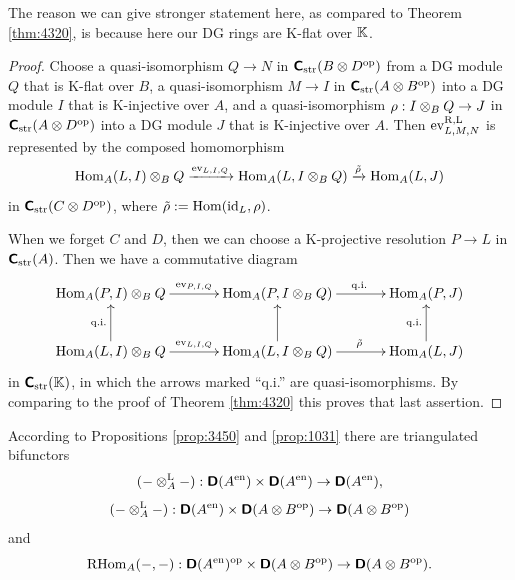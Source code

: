 The reason we can give stronger statement here, as compared to 
Theorem \ref{thm:4320}, is because here our DG rings are K-flat 
over $\mathbb{K}$. 

\begin{proof}
Choose a quasi-isomorphism $Q \to N$ in 
$\boldsymbol{\mathsf{C}}_{\mathrm{str}}(B \otimes D^{\mathrm{op}})$ from a DG module $Q$ that is 
K-flat over $B$, a quasi-isomorphism $M \to I$ in 
$\boldsymbol{\mathsf{C}}_{\mathrm{str}}(A \otimes B^{\mathrm{op}})$ into a DG module $I$ that is 
K-injective over $A$, and a quasi-isomorphism 
$\rho : I \otimes_B Q \to J$ in $\boldsymbol{\mathsf{C}}_{\mathrm{str}}(A \otimes D^{\mathrm{op}})$ into a 
DG module $J$ that is K-injective over $A$. Then 
$\operatorname{ev}^{\mathrm{R, L}}_{L, M, N}$
is represented by the composed homomorphism 
\[  \operatorname{Hom}_A(L, I) \otimes_B Q \xrightarrow{ \operatorname{ev}_{L, I, Q} }  
\operatorname{Hom}_A(L, I \otimes_B Q) \xrightarrow{\tilde{\rho}} \operatorname{Hom}_A(L, J)  \]
in $\boldsymbol{\mathsf{C}}_{\mathrm{str}}(C \otimes D^{\mathrm{op}})$,
where $\tilde{\rho} := \operatorname{Hom}(\operatorname{id}_L, \rho)$. 

When we forget $C$ and $D$, then we can choose a K-projective resolution 
$P \to L$ in $\boldsymbol{\mathsf{C}}_{\mathrm{str}}(A)$. Then we have a commutative diagram 
\[ \UseTips \xymatrix @C=8ex @R=6ex {
\opn{Hom}_A(P, I) \ot_B Q
\ar[r]^{ \opn{ev}_{P, I, Q} }
&
\opn{Hom}_A(P, I \ot_B Q) 
\ar[r]^(0.55){\mrm{q.i.}}
&
\opn{Hom}_A(P, J)
\\
\opn{Hom}_A(L, I) \ot_B Q
\ar[r]^{ \opn{ev}_{L, I, Q} }
\ar[u]^{\mrm{q.i.}}
&
\opn{Hom}_A(L, I \ot_B Q) 
\ar[r]^(0.55){\til{\rho}}
\ar[u]
&
\opn{Hom}_A(L, J)
\ar[u]^{\mrm{q.i.}}
} \]
in $\boldsymbol{\mathsf{C}}_{\mathrm{str}}(\mathbb{K})$, in which the arrows marked ``q.i.'' are 
quasi-isomorphisms. By comparing to the proof of Theorem \ref{thm:4320}
this proves that last assertion.
\end{proof}

According to Propositions \ref{prop:3450}
and \ref{prop:1031} there are triangulated bifunctors 
\begin{equation} \label{eqn:3477}
(- \otimes^{\mathrm{L}}_{A} -) : \boldsymbol{\mathsf{D}}(A^{\mathrm{en}}) \times 
\boldsymbol{\mathsf{D}}(A^{\mathrm{en}}) \to \boldsymbol{\mathsf{D}}(A^{\mathrm{en}}) ,
\end{equation}
\begin{equation} \label{eqn:3478}
(- \otimes^{\mathrm{L}}_{A} -) : \boldsymbol{\mathsf{D}}(A^{\mathrm{en}}) \times 
\boldsymbol{\mathsf{D}}(A \otimes B^{\mathrm{op}}) \to \boldsymbol{\mathsf{D}}(A \otimes B^{\mathrm{op}}) 
\end{equation}
and
\begin{equation} \label{eqn:1479}
\operatorname{RHom}_A(-, -) : \boldsymbol{\mathsf{D}}(A^{\mathrm{en}})^{\mathrm{op}} \times 
\boldsymbol{\mathsf{D}}(A \otimes B^{\mathrm{op}}) \to \boldsymbol{\mathsf{D}}(A \otimes B^{\mathrm{op}}) .
\end{equation}

